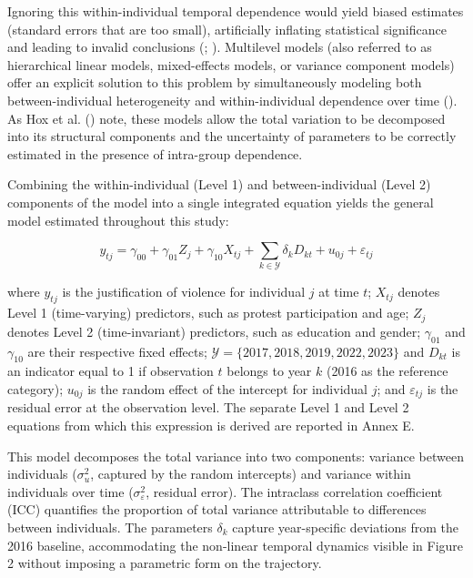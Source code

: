 \documentclass[
  13pt,
]{article}
\begin{document}
Ignoring this within-individual temporal dependence would yield biased
estimates (standard errors that are too small), artificially inflating
statistical significance and leading to invalid conclusions
(;
). Multilevel models
(also referred to as hierarchical linear models, mixed-effects models,
or variance component models) offer an explicit solution to this problem
by simultaneously modeling both between-individual heterogeneity and
within-individual dependence over time
(). As Hox et
al. () note, these
models allow the total variation to be decomposed into its structural
components and the uncertainty of parameters to be correctly estimated
in the presence of intra-group dependence.

Combining the within-individual (Level 1) and between-individual (Level
2) components of the model into a single integrated equation yields the
general model estimated throughout this study:

\[
y_{tj} = \gamma_{00} + \gamma_{01} Z_j + \gamma_{10} X_{tj} + \sum_{k \in \mathcal{Y}} \delta_k D_{kt} + u_{0j} + \varepsilon_{tj}
\]

where \(y_{tj}\) is the justification of violence for individual \(j\)
at time \(t\); \(X_{tj}\) denotes Level 1 (time-varying) predictors,
such as protest participation and age; \(Z_j\) denotes Level 2
(time-invariant) predictors, such as education and gender;
\(\gamma_{01}\) and \(\gamma_{10}\) are their respective fixed effects;
\(\mathcal{Y} = \{2017, 2018, 2019, 2022, 2023\}\) and \(D_{kt}\) is an
indicator equal to 1 if observation \(t\) belongs to year \(k\) (2016 as
the reference category); \(u_{0j}\) is the random effect of the
intercept for individual \(j\); and \(\varepsilon_{tj}\) is the residual
error at the observation level. The separate Level 1 and Level 2
equations from which this expression is derived are reported in Annex E.

This model decomposes the total variance into two components: variance
between individuals (\(\sigma^2_u\), captured by the random intercepts)
and variance within individuals over time (\(\sigma^2_\varepsilon\),
residual error). The intraclass correlation coefficient (ICC) quantifies
the proportion of total variance attributable to differences between
individuals. The parameters \(\delta_k\) capture year-specific
deviations from the 2016 baseline, accommodating the non-linear temporal
dynamics visible in Figure 2 without imposing a parametric form on the
trajectory.
\end{document}
